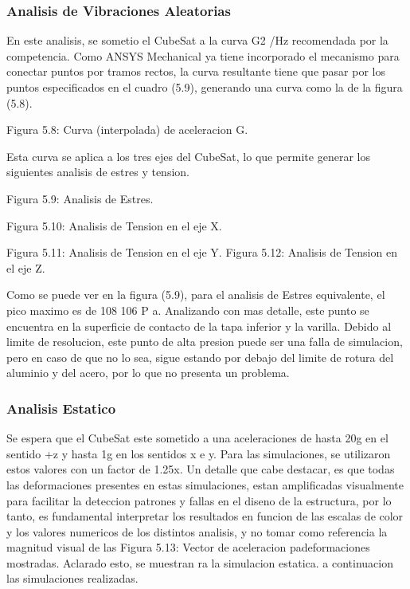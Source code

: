     \subsubsection{Analisis de Vibraciones Aleatorias}

    En este analisis, se sometio el CubeSat a la curva G2 /Hz recomendada por la competencia. Como
    ANSYS Mechanical ya tiene incorporado el mecanismo para conectar puntos por
    tramos rectos, la curva resultante tiene que pasar por los puntos especificados en el cuadro
    (5.9), generando una curva como la de la figura (5.8).


    Figura 5.8: Curva (interpolada) de aceleracion G.

    Esta curva se aplica a los tres ejes del CubeSat, lo que permite generar los siguientes
    analisis de estres y tension.

    Figura 5.9: Analisis de Estres.

    Figura 5.10: Analisis de Tension en el eje X.

    Figura 5.11: Analisis de Tension en el eje Y. Figura 5.12: Analisis de Tension en el eje Z.

    Como se puede ver en la figura (5.9), para el analisis de Estres equivalente, el pico maximo
    es de 108  106 P a. Analizando con mas detalle, este punto se encuentra en la superficie de
    contacto de la tapa inferior y la varilla. Debido al limite de resolucion, este punto de alta
    presion puede ser una falla de simulacion, pero en caso de que no lo sea, sigue estando por
    debajo del limite de rotura del aluminio y del acero, por lo que no presenta un problema.

    \subsubsection{Analisis Estatico}

    Se espera que el CubeSat este sometido a una aceleraciones de hasta 20g en el sentido +z y hasta 1g en
    los sentidos x e y. Para las simulaciones, se utilizaron
    estos valores con un factor de 1.25x. Un detalle que cabe destacar, es que todas las deformaciones presentes
    en estas simulaciones, estan amplificadas visualmente para facilitar la deteccion patrones y fallas en el
    diseno de la estructura, por lo tanto, es fundamental
    interpretar los resultados en funcion de las escalas de
    color y los valores numericos de los distintos analisis,
    y no tomar como referencia la magnitud visual de las
    Figura 5.13: Vector de aceleracion padeformaciones mostradas. Aclarado esto, se muestran
    ra la simulacion estatica.
    a continuacion las simulaciones realizadas.

